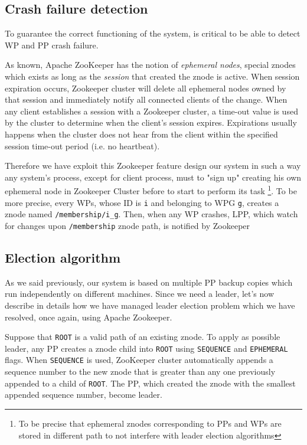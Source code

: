 \documentclass[sigchi]{acmart}
\begin{document}
\subsection{Crash failure detection} To guarantee the correct functioning of the system, is critical to be able to detect WP and PP crash failure. 

As known, Apache ZooKeeper has the notion of \textit{ephemeral nodes}, special znodes which exists as long as the \textit{session} that created the znode is active. When session expiration occurs, Zookeeper cluster will delete all ephemeral nodes owned by that session and immediately notify all connected clients of the change. When any client establishes a session with a Zookeeper cluster, a time-out value is used by the cluster to determine when the client's session expires. Expirations usually happens when the cluster does not hear from the client within the specified session time-out period (i.e. no heartbeat). 

Therefore we have exploit this Zookeeper feature design our system in such a way any system's process, except for client process, must to "sign up" creating his own ephemeral node in Zookeeper Cluster before to start to perform its task \footnote{To be precise that ephemeral znodes corresponding to PPs and WPs are stored in different path to not interfere with leader election algorithms}. To be more precise, every WPs, whose ID is \texttt{i} and belonging to WPG \texttt{g}, creates a znode named \texttt{/membership/i\_g}. Then, when any WP crashes, LPP, which watch for changes upon \texttt{/membership} znode path, is notified by Zookeeper


\subsection{Election algorithm}

As we said previously, our system is based on multiple PP backup copies which run independently on different machines. Since we need a leader, let's now describe in details how we have managed leader election problem which we have resolved, once again, using Apache Zookeeper.

Suppose that \texttt{ROOT} is a valid path of an existing znode. To apply as possible leader, any PP creates a znode child into \texttt{ROOT} using \texttt{SEQUENCE} and \texttt{EPHEMERAL} flags. When \texttt{SEQUENCE} is used, ZooKeeper cluster automatically appends a sequence number to the new znode that is greater than any one previously appended to a child of \texttt{ROOT}. The PP, which created the znode with the smallest appended sequence number, become leader.
\end{document}
